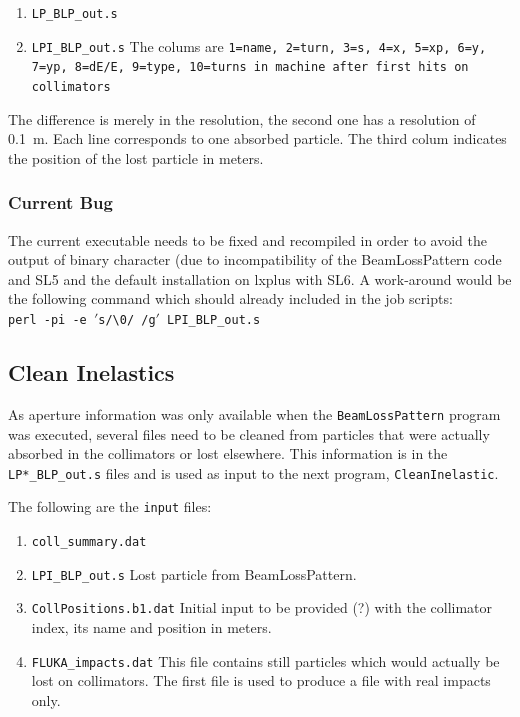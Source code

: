 \documentclass[a4paper, oneside, final]{scrartcl}
\begin{document}
{\begin{enumerate}
\item \texttt{LP\_BLP\_out.s}
\item \texttt{LPI\_BLP\_out.s} The colums are \texttt{1=name, 2=turn, 3=s, 4=x, 5=xp, 6=y, 7=yp, 8=dE/E, 9=type, 10=turns in machine after first hits on collimators}
\end{enumerate}
The difference is merely in the resolution, the second one has a resolution of 0.1~m. Each line corresponds to one absorbed particle. The third colum indicates the position of the lost particle in meters. 
\subsubsection{Current Bug}
The current executable needs to be fixed and recompiled in order to avoid the output of binary character (due to incompatibility of the BeamLossPattern code and SL5 and the default installation on lxplus with SL6. A work-around would be the following command which should already included in the job scripts:\\
\texttt{perl -pi -e $'$s/\textbackslash0/ /g$'$ LPI\_BLP\_out.s}


\subsection{Clean Inelastics}

As aperture information was only available when the \texttt{BeamLossPattern} program was executed, several files need to be cleaned from particles that were actually absorbed in the collimators or lost elsewhere. This information is in the \texttt{LP*\_BLP\_out.s} files and is used as input to the next program, \texttt{CleanInelastic}.

The following are the \texttt{input} files:

\begin{enumerate}
\item \texttt{coll\_summary.dat} 

\item \texttt{LPI\_BLP\_out.s} Lost particle from BeamLossPattern.
\item \texttt{CollPositions.b1.dat} Initial input to be provided (?) with the collimator index, its name and position in meters.
\item \texttt{FLUKA\_impacts.dat} This file contains still particles which would actually be lost on collimators. The first file is used to produce a file with real impacts only.
\end{enumerate}

}
\end{document}
